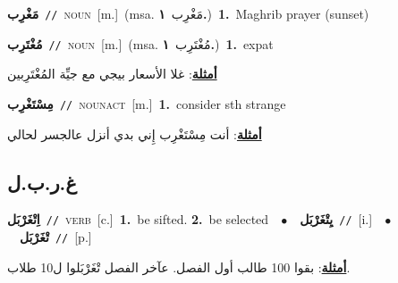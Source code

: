 \documentclass[10pt,a4paper,twoside]{article} %
\begin{document}
\begin{multicols}{2}
{{{{{{{{{{{\setlength\topsep{0pt}\textbf{\foreignlanguage{arabic}{مَغْرِب}}\ {\color{gray}\texttt{//}\color{black}}\ \textsc{noun}\ [m.]\ \color{gray}(msa. \foreignlanguage{arabic}{مَغْرِب}~\foreignlanguage{arabic}{\textbf{١.}})\color{black}\ \textbf{1.}~Maghrib prayer (sunset)\ 

{\setlength\topsep{0pt}\textbf{\foreignlanguage{arabic}{مُغْتَرِب}}\ {\color{gray}\texttt{//}\color{black}}\ \textsc{noun}\ [m.]\ \color{gray}(msa. \foreignlanguage{arabic}{مُغْتَرِب}~\foreignlanguage{arabic}{\textbf{١.}})\color{black}\ \textbf{1.}~expat\  \begin{flushright}\color{gray}\foreignlanguage{arabic}{\textbf{\underline{\foreignlanguage{arabic}{أمثلة}}}: غلا الأسعار بيجي مع جيِّة المُغْتَرِبين}\end{flushright}\color{black}} \vspace{2mm}

{\setlength\topsep{0pt}\textbf{\foreignlanguage{arabic}{مِسْتَغْرِب}}\ {\color{gray}\texttt{//}\color{black}}\ \textsc{noun\textunderscore act}\ [m.]\ \textbf{1.}~consider sth strange\  \begin{flushright}\color{gray}\foreignlanguage{arabic}{\textbf{\underline{\foreignlanguage{arabic}{أمثلة}}}: أنت مِسْتَغْرِب إِني بدي أنزل عالجسر لحالي}\end{flushright}\color{black}} \vspace{2mm}

\vspace{-3mm}
\subsection*{\color{blue}\foreignlanguage{arabic}{غ.ر.ب.ل}\color{blue}{}} 

{\setlength\topsep{0pt}\textbf{\foreignlanguage{arabic}{اِتْغَرْبَل}}\ {\color{gray}\texttt{//}\color{black}}\ \textsc{verb}\ [c.]\ \textbf{1.}~be sifted.  \textbf{2.}~be selected\ \ $\bullet$\ \ \setlength\topsep{0pt}\textbf{\foreignlanguage{arabic}{يِتْغَرْبَل}}\ {\color{gray}\texttt{//}\color{black}}\ [i.]\ \ $\bullet$\ \ \setlength\topsep{0pt}\textbf{\foreignlanguage{arabic}{تْغَرْبَل}}\ {\color{gray}\texttt{//}\color{black}}\ [p.]\  \begin{flushright}\color{gray}\foreignlanguage{arabic}{\textbf{\underline{\foreignlanguage{arabic}{أمثلة}}}: بقوا 100 طالب أول الفصل. عآخر الفصل تْغَرْبَلوا ل10 طلاب.}\end{flushright}\color{black}} \vspace{2mm}

}}}}}}}}}}}
\end{multicols}
\end{document}

